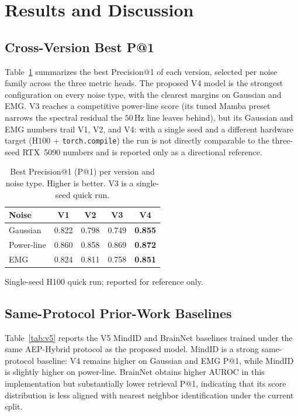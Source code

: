 \documentclass[conference,a4paper]{APSIPA2026}
\begin{document}
\section{Results and Discussion}
\subsection{Cross-Version Best P@1}
Table~\ref{tab:cross} summarizes the best Precision@1 of each version,
selected per noise family across the three metric heads. The proposed
V4 model is the strongest configuration on every noise type, with the
clearest margins on Gaussian and EMG. V3 reaches a competitive
power-line score (its tuned Mamba preset narrows the spectral residual
the $50$\,Hz line leaves behind), but its Gaussian and EMG numbers
trail V1, V2, and V4: with a single seed and a different hardware
target (H100 + \texttt{torch.compile}) the run is not directly
comparable to the three-seed RTX~5090 numbers and is reported only as
a directional reference.

\begin{table}[t]
\centering
\caption{Best Precision@1 (P@1) per version and noise type. Higher is
better. V3 is a single-seed quick run.}
\label{tab:cross}
\begin{threeparttable}
\begin{tabular}{l c c c c}
\toprule
\textbf{Noise} & \textbf{V1} & \textbf{V2} & \textbf{V3}\tnote{$\dagger$}
& \textbf{V4} \\
\midrule
Gaussian   & 0.822 & 0.798 & 0.749 & \textbf{0.855} \\
Power-line & 0.860 & 0.858 & 0.869 & \textbf{0.872} \\
EMG        & 0.824 & 0.811 & 0.758 & \textbf{0.851} \\
\bottomrule
\end{tabular}
\begin{tablenotes}\footnotesize
\item[$\dagger$] Single-seed H100 quick run; reported for reference only.
\end{tablenotes}
\end{threeparttable}
\end{table}



\subsection{Same-Protocol Prior-Work Baselines}
Table~\ref{tab:v5} reports the V5 MindID and BrainNet baselines trained
under the same AEP-Hybrid protocol as the proposed model. MindID is a
strong same-protocol baseline: V4 remains higher on Gaussian and EMG
P@1, while MindID is slightly higher on power-line. BrainNet obtains
higher AUROC in this implementation but substantially lower retrieval
P@1, indicating that its score distribution is less aligned with nearest
neighbor identification under the current split.
\end{document}
